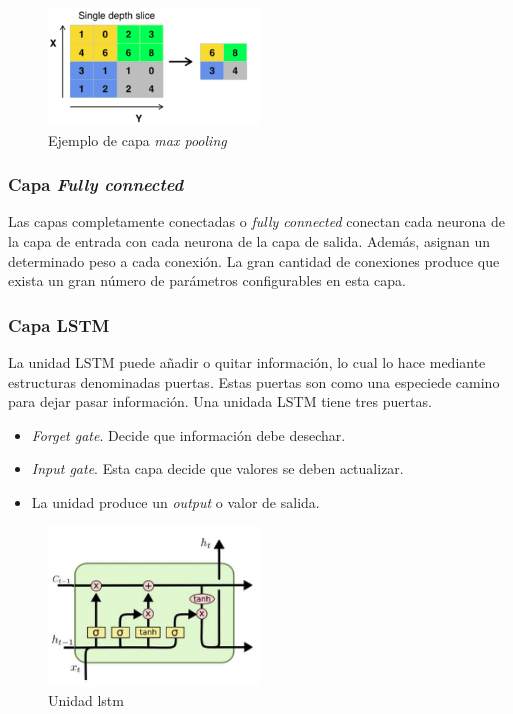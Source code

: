 \begin{figure}[H]
  \begin{center}
    \includegraphics[width=0.5\textwidth]{figures/Introduccion/pooling.png}
		\caption{Ejemplo de capa \textit{max pooling}}
		\label{fig.pooling}
		\end{center}
\end{figure}


\subsubsection{Capa \textit{Fully connected}}

Las capas completamente conectadas o \textit{fully connected} conectan cada neurona de la capa de entrada con cada neurona de la capa de salida. Además, asignan un determinado peso a cada conexión. La gran cantidad de conexiones produce que exista un gran número de parámetros configurables en esta capa.


\subsubsection{Capa LSTM}

La unidad LSTM puede añadir o quitar información, lo cual lo hace mediante estructuras denominadas puertas. Estas puertas son como una especiede camino para dejar pasar información. Una unidada LSTM tiene tres puertas.

\begin{itemize}
    \item \textit{Forget gate}. Decide que información debe desechar. 
    \item \textit{Input gate}. Esta capa decide que valores se deben actualizar.
    \item La unidad produce un \textit{output} o valor de salida.
\end{itemize}

\begin{figure}[H]
  \begin{center}
    \includegraphics[width=0.5\textwidth]{figures/Introduccion/unidad_lstm.png}
		\caption{Unidad \acrshort{lstm}}
		\label{fig.unidad_lstm}
		\end{center}
\end{figure}
